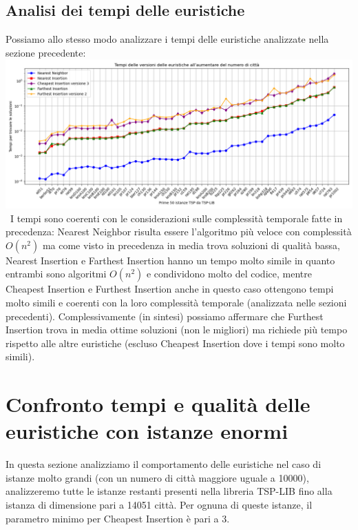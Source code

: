\documentclass[a4paper,12pt]{report}
\begin{document}
\subsection{Analisi dei tempi delle euristiche}
Possiamo allo stesso modo analizzare i tempi delle euristiche analizzate nella sezione precedente: \newline
\includegraphics[width=1\textwidth]{../Grafici/8.png} \
I tempi sono coerenti con le considerazioni sulle complessità temporale fatte in precedenza: Nearest Neighbor risulta essere l'algoritmo più veloce con complessità $O(n^2)$ ma come visto in precedenza in media trova soluzioni di qualità bassa, Nearest Insertion e Farthest Insertion hanno un tempo molto simile in quanto entrambi sono algoritmi $O(n^2)$ e condividono molto del codice, mentre Cheapest Insertion e Furthest Insertion anche in questo caso ottengono tempi molto simili e coerenti con la loro complessità temporale (analizzata nelle sezioni precedenti). \newline Complessivamente (in sintesi) possiamo affermare che Furthest Insertion trova in media ottime soluzioni (non le migliori) ma richiede più tempo rispetto alle altre euristiche (escluso Cheapest Insertion dove i tempi sono molto simili).

\section{Confronto tempi e qualità delle euristiche con istanze enormi}
In questa sezione analizziamo il comportamento delle euristiche nel caso di istanze molto grandi (con un numero di città maggiore uguale a 10000), analizzeremo tutte le istanze restanti presenti nella libreria TSP-LIB fino alla istanza di dimensione pari a 14051 città. Per ognuna di queste istanze, il parametro minimo per Cheapest Insertion è pari a 3. \newline
\end{document}
